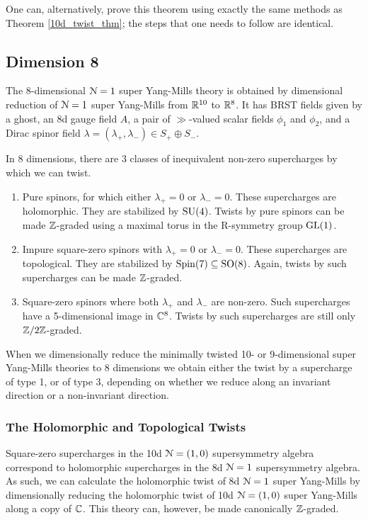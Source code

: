 \documentclass[10pt, oneside]{article}
\begin{document}
\begin{remark}
One can, alternatively, prove this theorem using exactly the same methods as Theorem \ref{10d_twist_thm}; the steps that one needs to follow are identical.
\end{remark}

\subsection{Dimension 8}
The 8-dimensional $\mathcal{N}=1$ super Yang-Mills theory is obtained by dimensional reduction of $\mathcal{N}=1$ super Yang-Mills from $\mathbb R^{10}$ to $\mathbb R^8$.  It has BRST fields given by a ghost, an 8d gauge field $A$, a pair of $\gg$-valued scalar fields $\phi_1$ and $\phi_2$, and a Dirac spinor field $\lambda = (\lambda_+, \lambda_-) \in S_+ \oplus S_-$.

In 8 dimensions, there are 3 classes of inequivalent non-zero supercharges by which we can twist.
\begin{enumerate}
 \item Pure spinors, for which either $\lambda_+ = 0$ or $\lambda_- = 0$.  These supercharges are holomorphic.  They are stabilized by $\mathrm{SU}(4)$.  Twists by pure spinors can be made $\mathbb Z$-graded using a maximal torus in the R-symmetry group $\mathrm{GL}(1)$.
 \item Impure square-zero spinors with $\lambda_+ = 0$ or $\lambda_- = 0$.  These supercharges are topological.  They are stabilized by $\mathrm{Spin}(7) \subseteq \mathrm{SO}(8)$.  Again, twists by such supercharges can be made $\mathbb Z$-graded.
 \item Square-zero spinors where both $\lambda_+$ and $\lambda_-$ are non-zero.  Such supercharges have a 5-dimensional image in $\mathbb C^8$.  Twists by such supercharges are still only $\mathbb Z/2\mathbb Z$-graded.
\end{enumerate}

When we dimensionally reduce the minimally twisted 10- or 9-dimensional super Yang-Mills theories to 8 dimensions we obtain either the twist by a supercharge of type 1, or of type 3, depending on whether we reduce along an invariant direction or a non-invariant direction. 

\subsubsection{The Holomorphic and Topological Twists}
Square-zero supercharges in the 10d $\mathcal{N}=(1,0)$ supersymmetry algebra correspond to holomorphic supercharges in the 8d $\mathcal{N}=1$ supersymmetry algebra.  As such, we can calculate the holomorphic twist of 8d $\mathcal{N}=1$ super Yang-Mills by dimensionally reducing the holomorphic twist of 10d $\mathcal{N}=(1,0)$ super Yang-Mills along a copy of $\mathbb C$.  This theory can, however, be made canonically $\mathbb Z$-graded.
\end{document}
